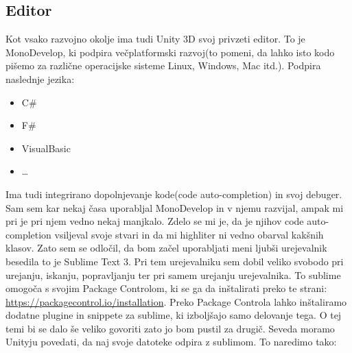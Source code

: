 {\color{indiagreen}\subsection{Editor}}
Kot vsako razvojno okolje ima tudi Unity 3D svoj privzeti editor. To je MonoDevelop, ki podpira večplatformski razvoj(to pomeni, da lahko isto kodo pišemo za različne operacijske sisteme Linux, Windows, Mac itd.). Podpira naslednje jezika: \\
\begin{itemize}
	\item C\#
	\item F\#
	\item VisualBasic
	\item \dots
\end{itemize}
Ima tudi integrirano dopolnjevanje kode(code auto-completion) in svoj debuger. Sam sem kar nekaj časa uporabljal MonoDevelop in v njemu razvijal, ampak mi pri je pri njem vedno nekaj manjkalo. Zdelo se mi je, da je njihov code auto-completion vsiljeval svoje stvari in da mi highliter ni vedno obarval kakšnih klasov. Zato sem se odločil, da bom začel uporabljati meni ljubši urejevalnik besedila to je Sublime Text 3. Pri tem urejevalniku sem dobil veliko svobodo pri urejanju, iskanju, popravljanju ter pri samem urejanju urejevalnika. To sublime omogoča s svojim Package Controlom, ki se ga da inštalirati preko te strani: \url{https://packagecontrol.io/installation}. Preko Package Controla lahko inštaliramo dodatne plugine in snippete za sublime, ki izboljšajo samo delovanje tega. O tej temi bi se dalo še veliko govoriti zato jo bom pustil za drugič. Seveda moramo Unityju povedati, da naj svoje datoteke odpira z sublimom. To naredimo tako:\\
